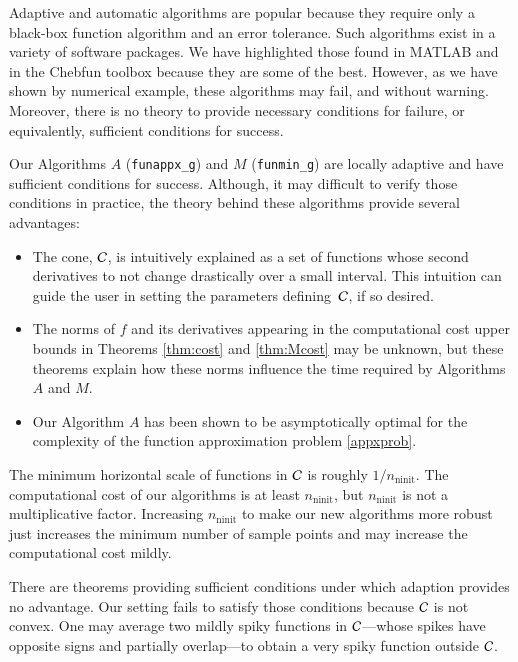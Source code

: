 \documentclass[review]{elsarticle}
\theoremstyle{definition}
\DeclareMathOperator{\ninit}{ninit}
\newcommand{\funappxg}{\texttt{funappx\_g}\xspace}
\newcommand{\funming}{\texttt{funmin\_g}\xspace}
\begin{document}
Adaptive and automatic algorithms are popular because they require only a
black-box function algorithm and an error tolerance. Such algorithms exist in a
variety of software packages. We have highlighted those found in MATLAB and in
the Chebfun toolbox because they are some of the best. However, as we have shown
by numerical example, these algorithms may fail, and without warning. Moreover,
there is no theory to provide necessary conditions for failure, or equivalently,
sufficient conditions for success.

Our Algorithms $A$ (\funappxg) and $M$ (\funming) are locally adaptive and have
sufficient conditions for success. Although, it may difficult to
verify those conditions in practice, the theory behind these algorithms provide
several advantages: 

\begin{itemize}
	
\item The cone, $\mathcal{C}$, is intuitively explained as a set of functions whose  second 
derivatives to not change drastically over a small interval.
This intuition can guide the user in setting the parameters defining~$\mathcal{C}$, if
so desired.
	
\item The norms of $f$ and its derivatives appearing in the computational cost
upper bounds in Theorems \ref{thm:cost} and \ref{thm:Mcost} may be unknown, but 
these theorems explain how these norms influence the time required by
Algorithms $A$ and $M$.
	
\item Our Algorithm $A$ has been shown to be asymptotically optimal for the
complexity of the function approximation problem \eqref{appxprob}.
	
\end{itemize}

The minimum horizontal scale of functions in $\mathcal{C}$ is roughly $1/n_{\ninit}$. The 
computational cost of our algorithms is at least $n_{\ninit}$, but $n_{\ninit}$ is not a
multiplicative factor. Increasing $n_{\ninit}$ to make our new algorithms more robust
just increases the minimum number of sample points and may increase the
computational cost mildly.

There are theorems providing sufficient conditions under which adaption provides
no advantage. Our setting fails to satisfy those conditions because $\mathcal{C}$ is not
convex. One may average two mildly spiky functions in $\mathcal{C}$---whose spikes have
opposite signs and partially overlap---to obtain a very spiky function outside
$\mathcal{C}$.
\end{document}
